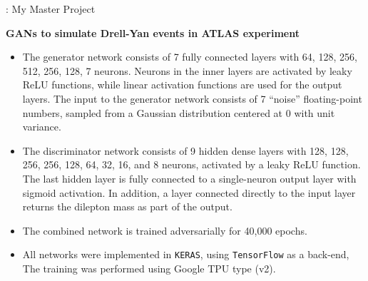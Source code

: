 \documentclass[11pt,aspectratio=169]{beamer}
\begin{document}
\begin{frame}{\underline{\secname} : My Master Project}
	
	\begin{center}
		\textbf{GANs to simulate Drell-Yan events in  ATLAS experiment}
	\end{center}
			\begin{itemize}			  \setlength\itemsep{0em}
\item
	
	The generator network consists of 7 fully connected layers with 64, 128, 256, 512, 256, 128, 7 neurons. Neurons in the inner layers are activated by leaky ReLU functions, while linear activation functions are used for the output layers. The input to the generator network consists of 7 ``noise'' floating-point numbers, sampled from a Gaussian distribution centered at 0 with unit variance. 
	
	\item

	The discriminator network consists of 9 hidden dense layers with 128, 128, 256, 256, 128, 64, 32, 16, and 8 neurons, activated by a leaky ReLU function. The last hidden layer is fully connected to a single-neuron output layer with sigmoid activation. In addition, a layer connected directly to the input layer returns the dilepton mass as part of the output.
	
\item

The combined network is trained adversarially for 40,000 epochs.

\item

All networks were implemented in {\tt KERAS}, using {\tt TensorFlow} as a back-end, The training was performed using Google TPU type (v2).	
	
				\end{itemize}

 \end{frame}

 
 
\end{document}

